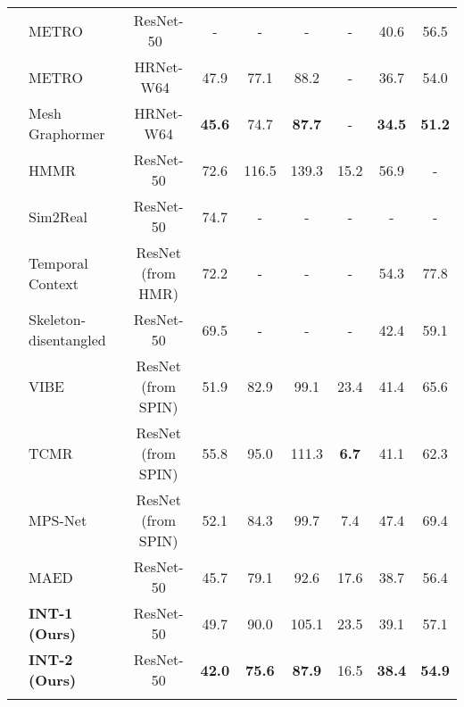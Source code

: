 \begin{table*}
{\begin{tabular}{llccccccc}
			& METRO~\citep{metro:lin2021end} &ResNet-50~& - & - & - & - & 40.6 & 56.5 \\
			& METRO~\citep{metro:lin2021end} &HRNet-W64~& 47.9 & 77.1 & 88.2 & - & 36.7 & 54.0 \\
		
			& Mesh Graphormer~\citep{meshgrahormer:lin2021mesh} &HRNet-W64& \textbf{45.6 }& 74.7 &\textbf{ 87.7} & - & \textbf{34.5} & \textbf{51.2 }\\
			
			\midrule
			
			\parbox[t]{2mm}{} 
			& 
			HMMR~\citep{hmmr:kanazawa2019learning} & ResNet-50& 72.6 & 116.5 & 139.3 & 15.2 & 56.9 & - \\
&   Sim2Real~\citep{sim2real:doersch2019sim2real} &ResNet-50&   74.7 &   - &   - &   - &   - &    - \\
			& Temporal Context~\citep{temporalcontext:arnab2019exploiting}& ResNet (from HMR) & 72.2 & - & - & - &  54.3 & 77.8 \\
			& Skeleton-disentangled~\citep{skeleton-disentangled:sun2019human} & ResNet-50 & 69.5 & - & - & - &  42.4 & 59.1 \\
& VIBE~\citep{vibe:kocabas2020vibe}&ResNet (from SPIN) & 51.9 & 82.9 & 99.1 & 23.4 & 41.4 & 65.6 \\ 
			&TCMR~\citep{tcmr:choi2021beyond} &ResNet (from SPIN)& 55.8 & 95.0 & 111.3 & \textbf{6.7} & 41.1 & 62.3 \\
			& MPS-Net~\citep{mps-net:wei2022capturing} &ResNet (from SPIN) & 52.1 & 84.3 & 99.7 &7.4 & 47.4 & 69.4\\
&  MAED~\citep{maed:wan2021encoder} &ResNet-50& 45.7 & 79.1 & 92.6 & 17.6 & 38.7 & 56.4 \\ 
			\cmidrule(lr){2-9}
			& \textbf{INT-1 (Ours)}  &ResNet-50& 49.7   & 90.0   & 105.1   & 23.5   & 39.1   & 57.1  \\
			& \textbf{INT-2 (Ours)} &ResNet-50& \textbf{42.0}  & \textbf{75.6} & \textbf{87.9}  & 16.5  & \textbf{38.4}  & \textbf{54.9}  \\
			
			\bottomrule
			& 		\end{tabular}
		
	}\vspace{-0.2in}

\end{table*}                                                                                                                           


